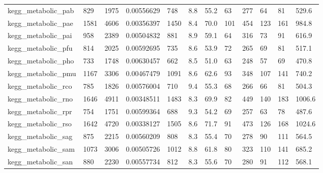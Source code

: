 \begin{longtable}{llllllllllll}
 kegg\_metabolic\_pab                                 & 829        & 1975      & 0.00556629  & 748   & 8.8    & 55.2   & 63    & 277    & 64     & 81     & 529.6   \\
 kegg\_metabolic\_pae                                 & 1581       & 4606      & 0.00356397  & 1450  & 8.4    & 70.0   & 101   & 454    & 123    & 161    & 984.8   \\
 kegg\_metabolic\_pai                                 & 958        & 2389      & 0.00504832  & 881   & 8.9    & 59.1   & 64    & 316    & 73     & 91     & 616.9   \\
 kegg\_metabolic\_pfu                                 & 814        & 2025      & 0.00592695  & 735   & 8.6    & 53.9   & 72    & 265    & 69     & 81     & 517.1   \\
 kegg\_metabolic\_pho                                 & 733        & 1748      & 0.00630457  & 662   & 8.5    & 51.0   & 63    & 248    & 57     & 69     & 470.8   \\
 kegg\_metabolic\_pmu                                 & 1167       & 3306      & 0.00467479  & 1091  & 8.6    & 62.6   & 93    & 348    & 107    & 141    & 740.2   \\
 kegg\_metabolic\_rco                                 & 785        & 1826      & 0.00576004  & 710   & 9.4    & 55.3   & 68    & 266    & 66     & 81     & 504.3   \\
 kegg\_metabolic\_rno                                 & 1646       & 4911      & 0.00348511  & 1483  & 8.3    & 69.9   & 82    & 449    & 140    & 183    & 1006.6  \\
 kegg\_metabolic\_rpr                                 & 754        & 1751      & 0.00599364  & 688   & 9.3    & 54.2   & 69    & 257    & 63     & 78     & 487.6   \\
 kegg\_metabolic\_rso                                 & 1642       & 4720      & 0.00338127  & 1505  & 8.6    & 71.7   & 91    & 473    & 126    & 168    & 1024.6  \\
 kegg\_metabolic\_sag                                 & 875        & 2215      & 0.00560209  & 808   & 8.3    & 55.4   & 70    & 278    & 90     & 111    & 564.5   \\
 kegg\_metabolic\_sam                                 & 1073       & 3006      & 0.00505726  & 1012  & 8.8    & 61.8   & 80    & 323    & 110    & 141    & 685.2   \\
 kegg\_metabolic\_san                                 & 880        & 2230      & 0.00557734  & 812   & 8.3    & 55.6   & 70    & 280    & 91     & 112    & 568.1   \\

\end{longtable}
